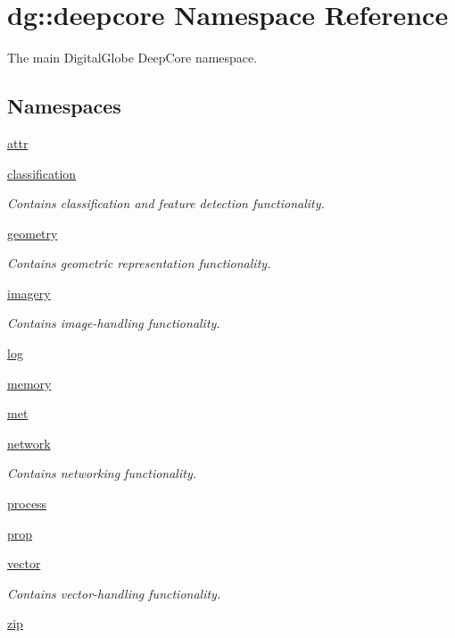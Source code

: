 \hypertarget{namespacedg_1_1deepcore}{}\section{dg\+:\+:deepcore Namespace Reference}
\label{namespacedg_1_1deepcore}


The main Digital\+Globe Deep\+Core namespace.  


\subsection*{Namespaces}
\begin{DoxyCompactItemize}
\item 
 \hyperlink{namespacedg_1_1deepcore_1_1attr}{attr}
\item 
 \hyperlink{namespacedg_1_1deepcore_1_1classification}{classification}
\begin{DoxyCompactList}\small\item\em Contains classification and feature detection functionality. \end{DoxyCompactList}\item 
 \hyperlink{namespacedg_1_1deepcore_1_1geometry}{geometry}
\begin{DoxyCompactList}\small\item\em Contains geometric representation functionality. \end{DoxyCompactList}\item 
 \hyperlink{namespacedg_1_1deepcore_1_1imagery}{imagery}
\begin{DoxyCompactList}\small\item\em Contains image-\/handling functionality. \end{DoxyCompactList}\item 
 \hyperlink{namespacedg_1_1deepcore_1_1log}{log}
\item 
 \hyperlink{namespacedg_1_1deepcore_1_1memory}{memory}
\item 
 \hyperlink{namespacedg_1_1deepcore_1_1met}{met}
\item 
 \hyperlink{namespacedg_1_1deepcore_1_1network}{network}
\begin{DoxyCompactList}\small\item\em Contains networking functionality. \end{DoxyCompactList}\item 
 \hyperlink{namespacedg_1_1deepcore_1_1process}{process}
\item 
 \hyperlink{namespacedg_1_1deepcore_1_1prop}{prop}
\item 
 \hyperlink{namespacedg_1_1deepcore_1_1vector}{vector}
\begin{DoxyCompactList}\small\item\em Contains vector-\/handling functionality. \end{DoxyCompactList}\item 
 \hyperlink{namespacedg_1_1deepcore_1_1zip}{zip}
\end{DoxyCompactItemize}
